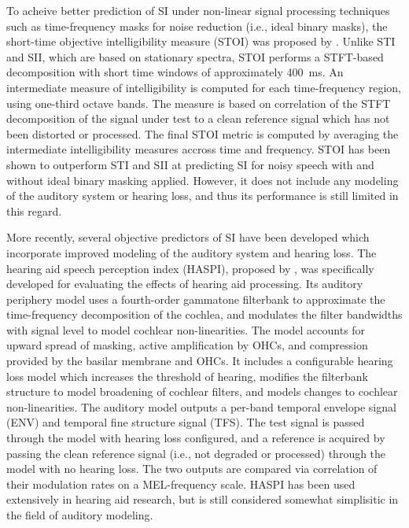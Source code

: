 To acheive better prediction of SI under non-linear signal processing techniques such as time-frequency masks for noise reduction (i.e., ideal binary masks), the short-time objective intelligibility measure (STOI) was proposed by \cite{taal2010short}. Unlike STI and SII, which are based on stationary spectra, STOI performs a STFT-based decomposition with short time windows of approximately \qty{400}{\milli\second}. An intermediate measure of intelligibility is computed for each time-frequency region, using one-third octave bands. The measure is based on correlation of the STFT decomposition of the signal under test to a clean reference signal which has not been distorted or processed. The final STOI metric is computed by averaging the intermediate intelligibility measures accross time and frequency. STOI has been shown to outperform STI and SII at predicting SI for noisy speech with and without ideal binary masking applied. However, it does not include any modeling of the auditory system or hearing loss, and thus its performance is still limited in this regard.

More recently, several objective predictors of SI have been developed which incorporate improved modeling of the auditory system and hearing loss. The hearing aid speech perception index (HASPI), proposed by \cite{kates2022overview}, was specifically developed for evaluating the effects of hearing aid processing. Its auditory periphery model uses a fourth-order gammatone filterbank to approximate the time-frequency decomposition of the cochlea, and modulates the filter bandwidths with signal level to model cochlear non-linearities. The model accounts for upward spread of masking, active amplification by OHCs, and compression provided by the basilar membrane and OHCs. It includes a configurable hearing loss model which increases the threshold of hearing, modifies the filterbank structure to model broadening of cochlear filters, and models changes to cochlear non-linearities. The auditory model outputs a per-band temporal envelope signal (ENV) and temporal fine structure signal (TFS). The test signal is passed through the model with hearing loss configured, and a reference is acquired by passing the clean reference signal (i.e., not degraded or processed) through the model with no hearing loss. The two outputs are compared via correlation of their modulation rates on a MEL-frequency scale. HASPI has been used extensively in hearing aid research, but is still considered somewhat simplisitic in the field of auditory modeling.

